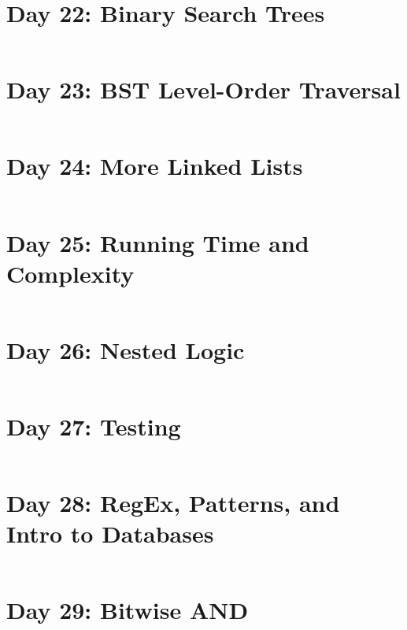 \documentclass[11pt,a4paper]{article}
\begin{document}
\newpage
\section{Day 22: Binary Search Trees}
\begin{lstlisting}
\end{lstlisting}

\newpage
\section{Day 23: BST Level-Order Traversal}
\begin{lstlisting}
\end{lstlisting}

\newpage
\section{Day 24: More Linked Lists}
\begin{lstlisting}
\end{lstlisting}

\newpage
\section{Day 25: Running Time and Complexity}
\begin{lstlisting}
\end{lstlisting}

\newpage
\section{Day 26: Nested Logic}
\begin{lstlisting}
\end{lstlisting}

\newpage
\section{Day 27: Testing}
\begin{lstlisting}
\end{lstlisting}

\newpage
\section{Day 28: RegEx, Patterns, and Intro to Databases}
\begin{lstlisting}
\end{lstlisting}

\newpage
\section{Day 29: Bitwise AND}
\begin{lstlisting}
\end{lstlisting}
\end{document}

